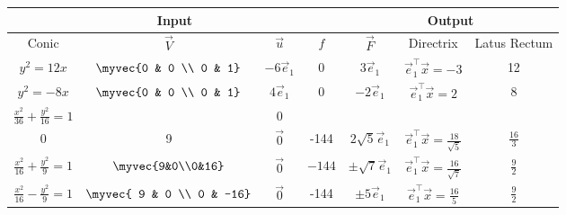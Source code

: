 \begin{tabular}{|c|c|c|c|c|c|c|}
\hline
\multicolumn{4}{|c|}{Input} & \multicolumn{3}{|c|}{Output} \\
\hline
Conic & $\vec{V}$ & $\vec{u}$ & $f$ & $\vec{F}$ & Directrix & Latus Rectum\\
\hline
$y^2=12x$  & $\myvec{0 & 0 \\ 0 & 1}$  & $-6\vec{e}_1$ & 0 & $3\vec{e}_1$ & $\vec{e}_1^{\top}\vec{x} = -3$ & 12 \\
\hline
$y^2=-8x$ &  $\myvec{0 & 0 \\ 0 & 1}$& $4\vec{e}_1$ & 0 & $-2\vec{e}_1$ & $\vec{e}_1^{\top}\vec{x} = 2$ & 8 \\
\hline
$\frac{x^2}{36}+\frac{y^2}{16}=1$ &\myvec{4&0\\0&9} & $\vec{0}$ &  -144& $2\sqrt{5}\vec{e}_1$ & $\vec{e}_1^{\top}\vec{x} = \frac{18}{\sqrt{5}}$ & $\frac{16}{3}$ \\
\hline
$\frac{x^2}{16}+\frac{y^2}{9}=1$ & $\myvec{9&0\\0&16}$ &$\vec{0}$    &  $-144$& $\pm\sqrt{7}\vec{e}_1$ & $\vec{e}_1^{\top}\vec{x} = \frac{16}{\sqrt{7}}$ & $\frac{9}{2}$ \\
\hline
$\frac{x^2}{16}-\frac{y^2}{9} = 1$ & $\myvec{ 9 & 0 \\ 0 & -16}$    & $\vec{0}$ & -144  & $\pm 5\vec{e}_1$ & $\vec{e}_1^{\top}\vec{x} = \frac{16}{5}$ & $\frac{9}{2}$ \\
\hline
\end{tabular}
